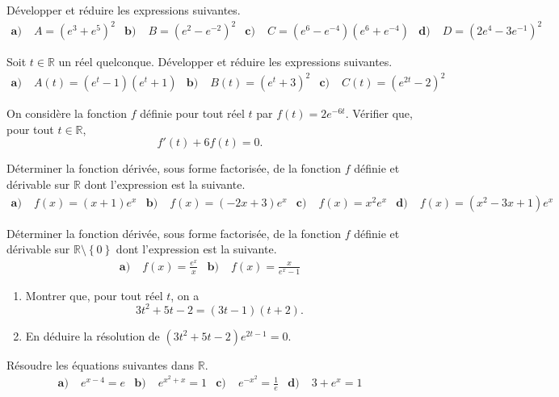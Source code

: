 \documentclass[11pt]{article}
\begin{document}
\begin{exo}
  Développer et réduire les expressions suivantes.
  \begin{align*}
    \textbf{a)}\;& A = \left( e^3+e^5 \right)^2 &
    \textbf{b)}\;& B = \left( e^2-e^{-2} \right)^2 &
    \textbf{c)}\;& C = \left( e^6-e^{-4} \right)\left( e^6+e^{-4} \right) &
    \textbf{d)}\;& D = \left( 2e^4-3e^{-1} \right)^2
  \end{align*}
\end{exo}

\begin{exo}
  Soit $t\in\mathbb{R}$ un réel quelconque. Développer et réduire les
  expressions suivantes.
  \begin{align*}
    \textbf{a)}\;& A(t) = \left( e^t-1 \right)\left( e^t+1 \right) &
    \textbf{b)}\;& B(t) = \left( e^t+3 \right)^2 &
    \textbf{c)}\;& C(t) = \left( e^{2t}-2 \right)^2
  \end{align*}
\end{exo}

\begin{exo}
  On considère la fonction $f$ définie pour tout réel $t$ par
  $f(t)=2e^{-6t}$. Vérifier que, pour tout $t\in\mathbb{R}$,
  \[
    f'(t) + 6f(t) = 0.
  \]
\end{exo}

\begin{exo}
  Déterminer la fonction dérivée, sous forme factorisée, de la fonction $f$
  définie et dérivable sur $\mathbb{R}$ dont l'expression est la suivante.
  \begin{align*}
    \textbf{a)}\;& f(x) = (x+1)e^x &
    \textbf{b)}\;& f(x) = \left( -2x+3 \right)e^x &
    \textbf{c)}\;& f(x) = x^2e^x &
    \textbf{d)}\;& f(x) = \left( x^2-3x+1 \right)e^x
  \end{align*}
\end{exo}

\begin{exo}
  Déterminer la fonction dérivée, sous forme factorisée, de la fonction $f$
  définie et dérivable sur $\mathbb{R}\setminus\left\{ 0 \right\}$ dont
  l'expression est la suivante.
  \begin{align*}
    \textbf{a)}\;& f(x) = \frac{e^x}{x} &
    \textbf{b)}\;& f(x) = \frac{x}{e^x-1}
  \end{align*}
\end{exo}

\begin{exo}
  \begin{enumerate}
    \item Montrer que, pour tout réel $t$, on a
      \[
        3t^2+5t-2 = (3t-1)(t+2).
      \]
    \item En déduire la résolution de $(3t^2+5t-2)e^{2t-1}=0$.
  \end{enumerate}
\end{exo}

\begin{exo}
  Résoudre les équations suivantes dans $\mathbb{R}$.
  \begin{align*}
    \textbf{a)}\;& e^{x-4} = e &
    \textbf{b)}\;& e^{x^2+x}= 1 &
    \textbf{c)}\;& e^{-x^2} = \frac{1}{e} &
    \textbf{d)}\;& 3+e^x=1
  \end{align*}
\end{exo}
\end{document}
